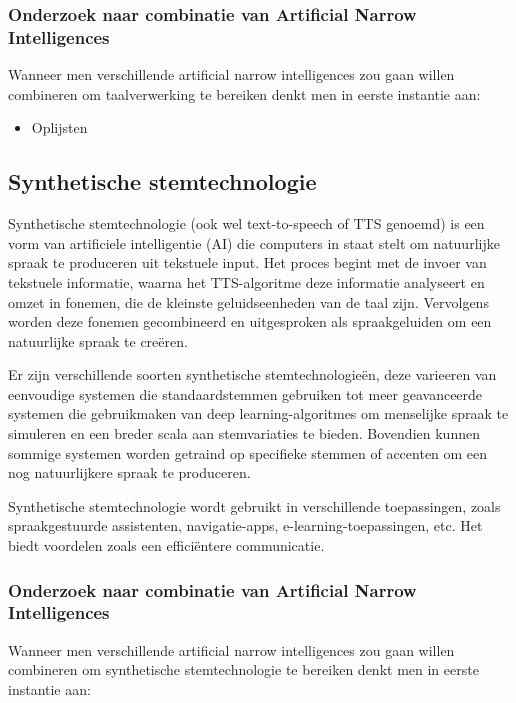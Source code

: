 \subsubsection{Onderzoek naar combinatie van Artificial Narrow Intelligences}

Wanneer men verschillende artificial narrow intelligences zou gaan willen combineren om taalverwerking te bereiken denkt men in eerste instantie aan:

\begin{itemize}
    \item Oplijsten
\end{itemize}

\subsection{Synthetische stemtechnologie}

Synthetische stemtechnologie (ook wel text-to-speech of TTS genoemd) is een vorm van artificiele intelligentie (AI) die computers in staat stelt om natuurlijke spraak te produceren uit tekstuele input. Het proces begint met de invoer van tekstuele informatie, waarna het TTS-algoritme deze informatie analyseert en omzet in fonemen, die de kleinste geluidseenheden van de taal zijn. Vervolgens worden deze fonemen gecombineerd en uitgesproken als spraakgeluiden om een natuurlijke spraak te creëren.

Er zijn verschillende soorten synthetische stemtechnologieën, deze varieeren van eenvoudige systemen die standaardstemmen gebruiken tot meer geavanceerde systemen die gebruikmaken van deep learning-algoritmes om menselijke spraak te simuleren en een breder scala aan stemvariaties te bieden. Bovendien kunnen sommige systemen worden getraind op specifieke stemmen of accenten om een nog natuurlijkere spraak te produceren.

Synthetische stemtechnologie wordt gebruikt in verschillende toepassingen, zoals spraakgestuurde assistenten, navigatie-apps, e-learning-toepassingen, etc. Het biedt voordelen zoals een efficiëntere communicatie.

\subsubsection{Onderzoek naar combinatie van Artificial Narrow Intelligences}

Wanneer men verschillende artificial narrow intelligences zou gaan willen combineren om synthetische stemtechnologie te bereiken denkt men in eerste instantie aan:

